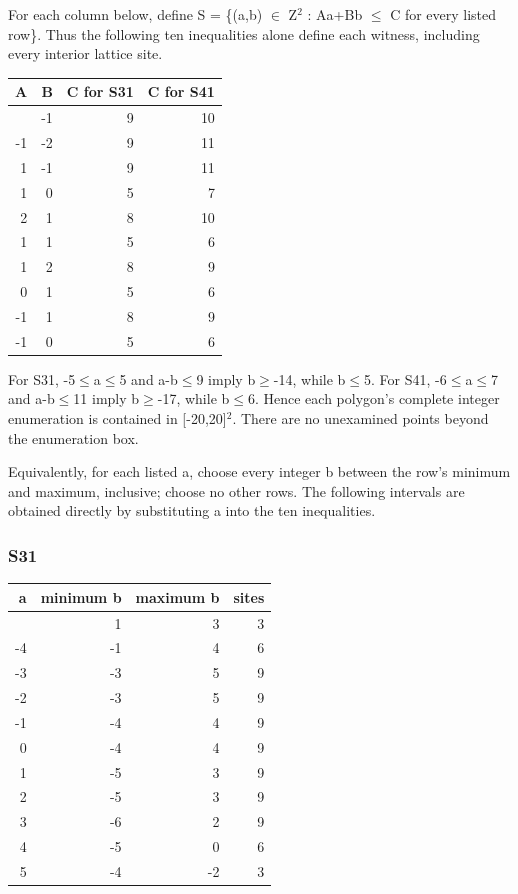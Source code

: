 \documentclass[
]{article}
\begin{document}
For each column below, define S = \{(a,b) \ensuremath{\in} Z\ensuremath{{}^2} : Aa+Bb \ensuremath{\le} C for every
listed row\}. Thus the following ten inequalities alone define each
witness, including every interior lattice site.

\begin{longtable}[]{@{}rrrr@{}}
\toprule\noalign{}
A & B & C for S31 & C for S41 \\
\midrule\noalign{}
\endhead
\bottomrule\noalign{}
\endlastfoot
-2 & -1 & 9 & 10 \\
-1 & -2 & 9 & 11 \\
1 & -1 & 9 & 11 \\
1 & 0 & 5 & 7 \\
2 & 1 & 8 & 10 \\
1 & 1 & 5 & 6 \\
1 & 2 & 8 & 9 \\
0 & 1 & 5 & 6 \\
-1 & 1 & 8 & 9 \\
-1 & 0 & 5 & 6 \\
\end{longtable}

For S31, -5\ensuremath{\le}a\ensuremath{\le}5 and a-b\ensuremath{\le}9 imply b\ensuremath{\ge}-14, while b\ensuremath{\le}5. For S41, -6\ensuremath{\le}a\ensuremath{\le}7 and
a-b\ensuremath{\le}11 imply b\ensuremath{\ge}-17, while b\ensuremath{\le}6. Hence each polygon's complete integer
enumeration is contained in {[}-20,20{]}\ensuremath{{}^2}. There are no unexamined
points beyond the enumeration box.

Equivalently, for each listed a, choose every integer b between the
row's minimum and maximum, inclusive; choose no other rows. The
following intervals are obtained directly by substituting a into the ten
inequalities.

\subsubsection{S31}\label{s31}

\begin{longtable}[]{@{}rrrr@{}}
\toprule\noalign{}
a & minimum b & maximum b & sites \\
\midrule\noalign{}
\endhead
\bottomrule\noalign{}
\endlastfoot
-5 & 1 & 3 & 3 \\
-4 & -1 & 4 & 6 \\
-3 & -3 & 5 & 9 \\
-2 & -3 & 5 & 9 \\
-1 & -4 & 4 & 9 \\
0 & -4 & 4 & 9 \\
1 & -5 & 3 & 9 \\
2 & -5 & 3 & 9 \\
3 & -6 & 2 & 9 \\
4 & -5 & 0 & 6 \\
5 & -4 & -2 & 3 \\
\end{longtable}
\end{document}
